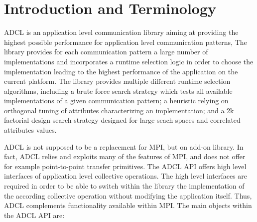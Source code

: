 \section{Introduction and Terminology}

ADCL is an application level communication library aiming at providing the
highest possible performance for application level communication patterns, The
library provides for each communication pattern a large number of
implementations and incorporates a runtime selection logic in order to choose
the implementation leading to the highest performance of the application on
the current platform. The library provides multiple different runtime
selection algorithms, including a brute force search strategy which tests all available
implementations of a given communication pattern; a heuristic
relying on orthogonal tuning of attributes characterizing an implementation;
and a 2k factorial design search strategy designed for large seach spaces and
correlated attributes values.

ADCL is not supposed to be a replacement for MPI, but on add-on library. In
fact, ADCL relies and exploits many of the features of MPI, and does not offer
for example point-to-point transfer primitives. The ADCL API
offers high level interfaces of application level collective operations. The
high level interfaces are required in order to be able to switch within the
library the implementation of the according collective operation without
modifying the application itself. Thus, ADCL complements functionality
available within MPI. The main objects within the ADCL API are:


